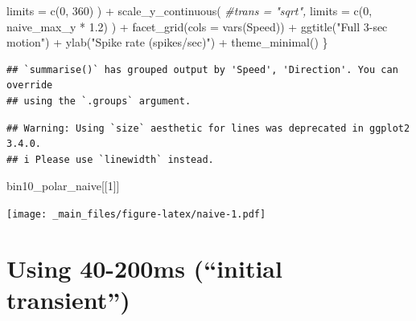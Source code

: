 \documentclass[
]{book}
\newenvironment{Shaded}{\begin{snugshade}}{\end{snugshade}}
\newcommand{\AttributeTok}[1]{\textcolor[rgb]{0.77,0.63,0.00}{#1}}
\newcommand{\CommentTok}[1]{\textcolor[rgb]{0.56,0.35,0.01}{\textit{#1}}}
\newcommand{\DecValTok}[1]{\textcolor[rgb]{0.00,0.00,0.81}{#1}}
\newcommand{\FloatTok}[1]{\textcolor[rgb]{0.00,0.00,0.81}{#1}}
\newcommand{\FunctionTok}[1]{\textcolor[rgb]{0.00,0.00,0.00}{#1}}
\newcommand{\NormalTok}[1]{#1}
\newcommand{\SpecialCharTok}[1]{\textcolor[rgb]{0.00,0.00,0.00}{#1}}
\newcommand{\StringTok}[1]{\textcolor[rgb]{0.31,0.60,0.02}{#1}}
\begin{document}
\begin{Shaded}
\begin{Highlighting}[]
      \AttributeTok{limits =} \FunctionTok{c}\NormalTok{(}\DecValTok{0}\NormalTok{, }\DecValTok{360}\NormalTok{)}
\NormalTok{    ) }\SpecialCharTok{+}
    \FunctionTok{scale\_y\_continuous}\NormalTok{(}
      \CommentTok{\#trans = "sqrt",}
      \AttributeTok{limits =} \FunctionTok{c}\NormalTok{(}\DecValTok{0}\NormalTok{, naive\_max\_y }\SpecialCharTok{*} \FloatTok{1.2}\NormalTok{)}
\NormalTok{    ) }\SpecialCharTok{+}
    \FunctionTok{facet\_grid}\NormalTok{(}\AttributeTok{cols =} \FunctionTok{vars}\NormalTok{(Speed)) }\SpecialCharTok{+}
    \FunctionTok{ggtitle}\NormalTok{(}\StringTok{"Full 3{-}sec motion"}\NormalTok{) }\SpecialCharTok{+}
    \FunctionTok{ylab}\NormalTok{(}\StringTok{"Spike rate (spikes/sec)"}\NormalTok{) }\SpecialCharTok{+}
    \FunctionTok{theme\_minimal}\NormalTok{()}
\NormalTok{\}}
\end{Highlighting}
\end{Shaded}

\begin{verbatim}
## `summarise()` has grouped output by 'Speed', 'Direction'. You can override
## using the `.groups` argument.
\end{verbatim}

\begin{verbatim}
## Warning: Using `size` aesthetic for lines was deprecated in ggplot2 3.4.0.
## i Please use `linewidth` instead.
\end{verbatim}

\begin{Shaded}
\begin{Highlighting}[]
\NormalTok{bin10\_polar\_naive[[}\DecValTok{1}\NormalTok{]]}
\end{Highlighting}
\end{Shaded}

\texttt{[image: \_main\_files/figure-latex/naive-1.pdf]}

\hypertarget{using-40-200ms-initial-transient}{%
\section{Using 40-200ms (``initial transient'')}\label{using-40-200ms-initial-transient}}
\end{document}
